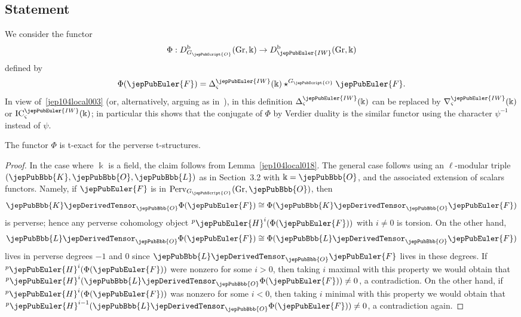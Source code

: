 \subsection{Statement}
\label{jep104local035}

We consider the functor
\[
\Phi : D^{\mathrm{b}}_{G_{\jepPubScript{O}}}(\mathrm{Gr}, \Bbbk) \to D^{\mathrm{b}}_{\jepPubEuler{IW}}(\mathrm{Gr}, \Bbbk)
\]
defined by
\[
\Phi(\jepPubEuler{F}) = \Delta^{\jepPubEuler{IW}}_\varsigma(\Bbbk) \star^{G_{\jepPubScript{O}}} \jepPubEuler{F}.
\]
In view of~\eqref{jep104local003} (or, alternatively, arguing as in~\cite{jep104ref17}), in this definition $
\Delta^{\jepPubEuler{IW}}_{\varsigma}(\Bbbk)$ can be replaced by $\nabla^{\jepPubEuler{IW}}_\varsigma(\Bbbk)$ or $ \mathrm{IC}^{\jepPubEuler{IW}}_\varsigma(\Bbbk)$; in particular this shows that the conjugate of $\Phi$ by Verdier duality is the similar functor using the character $\psi^{-1}$ instead of $\psi$. 

\begin{lem}
\label{jep104local016}
 The functor $\Phi$ is t-exact for the perverse t-structures.
\end{lem}

\begin{proof}
In the case where $\Bbbk$ is a field, the claim follows from Lemma~\ref{jep104local018}. The general case follows using an $\ell$-modular triple $(\jepPubBbb{K},\jepPubBbb{O},\jepPubBbb{L})$ as in Section~3.2 with $\Bbbk=\jepPubBbb{O}$, and the associated extension of scalars functors. Namely, if $\jepPubEuler{F}$ is in $\mathrm{Perv}_{G_{\jepPubScript{O}}}(\mathrm{Gr},\jepPubBbb{O})$, then
\[
\jepPubBbb{K}\jepDerivedTensor_{\jepPubBbb{O}}\Phi(\jepPubEuler{F})\cong\Phi(\jepPubBbb{K}\jepDerivedTensor_{\jepPubBbb{O}}\jepPubEuler{F})
\]
is perverse; hence any perverse cohomology object ${}^{p}\jepPubEuler{H}^i(\Phi(\jepPubEuler{F}))$ with $i\neq0$ is torsion. On the other hand,
\[
\jepPubBbb{L}\jepDerivedTensor_{\jepPubBbb{O}}\Phi(\jepPubEuler{F})\cong\Phi(\jepPubBbb{L}\jepDerivedTensor_{\jepPubBbb{O}}\jepPubEuler{F})
\]
lives in perverse degrees $-1$ and $0$ since $\jepPubBbb{L}\jepDerivedTensor_{\jepPubBbb{O}}\jepPubEuler{F}$ lives in these degrees. If ${}^{p}\jepPubEuler{H}^i(\Phi(\jepPubEuler{F}))$ were nonzero for some $i>0$, then taking $i$ maximal with this property we would obtain that ${}^{p}\jepPubEuler{H}^i(\jepPubBbb{L}\jepDerivedTensor_{\jepPubBbb{O}}\Phi(\jepPubEuler{F}))\neq0$, a contradiction. On the other hand, if ${}^{p}\jepPubEuler{H}^i(\Phi(\jepPubEuler{F}))$ was nonzero for some $i<0$, then taking $i$ minimal with this property we would obtain that ${}^{p}\jepPubEuler{H}^{i-1}(\jepPubBbb{L}\jepDerivedTensor_{\jepPubBbb{O}}\Phi(\jepPubEuler{F}))\neq0$, a contradiction again.
\end{proof}
 

